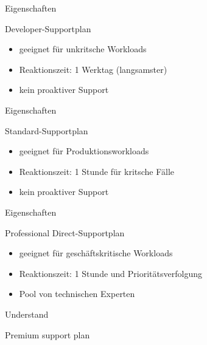 \documentclass{scrartcl}
\newenvironment{flashcard}[2][]{%
    #1
    \vfill
    \centerline{\Large{#2}}
    \vfill
\newpage
}
{\newpage}
\begin{document}
    \begin{flashcard}[Eigenschaften]{Developer-Supportplan}
        \begin{itemize}
            \item geeignet für unkritsche Workloads
            \item Reaktionszeit: 1 Werktag (langsamster)
            \item kein proaktiver Support
        \end{itemize}
    \end{flashcard}

    \begin{flashcard}[Eigenschaften]{Standard-Supportplan}
        \begin{itemize}
            \item geeignet für Produktionsworkloads
            \item Reaktionszeit: 1 Stunde für kritsche Fälle
            \item kein proaktiver Support
        \end{itemize}
    \end{flashcard}

    \begin{flashcard}[Eigenschaften]{Professional Direct-Supportplan}
        \begin{itemize}
            \item geeignet für geschäftskritische Workloads
            \item Reaktionszeit: 1 Stunde und Prioritätsverfolgung
            \item Pool von technischen Experten
        \end{itemize}
    \end{flashcard}

    \begin{flashcard}[Understand]{Premium support plan}

    \end{flashcard}
\end{document}
